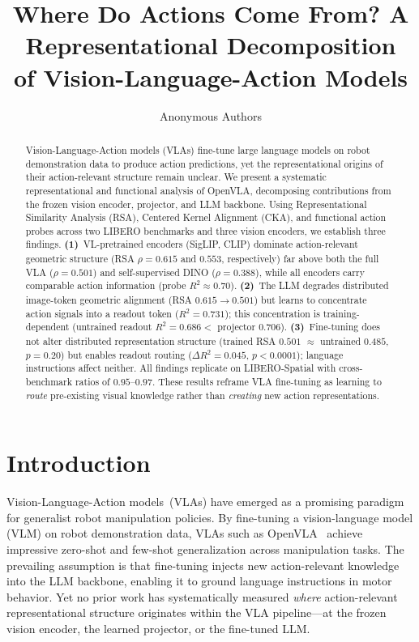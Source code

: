 \documentclass[letterpaper]{article}
\title{Where Do Actions Come From? A Representational Decomposition\\of Vision-Language-Action Models}
\author{
Anonymous Authors
}
\date{}
\begin{document}
\maketitle

\begin{abstract}
Vision-Language-Action models (VLAs) fine-tune large language models on robot demonstration data to produce action predictions, yet the representational origins of their action-relevant structure remain unclear.
We present a systematic representational and functional analysis of OpenVLA, decomposing contributions from the frozen vision encoder, projector, and LLM backbone.
Using Representational Similarity Analysis (RSA), Centered Kernel Alignment (CKA), and functional action probes across two LIBERO benchmarks and three vision encoders, we establish three findings.
\textbf{(1)}~VL-pretrained encoders (SigLIP, CLIP) dominate action-relevant geometric structure (RSA $\rho{=}0.615$ and $0.553$, respectively) far above both the full VLA ($\rho{=}0.501$) and self-supervised DINO ($\rho{=}0.388$), while all encoders carry comparable action information (probe $R^2{\approx}0.70$).
\textbf{(2)}~The LLM degrades distributed image-token geometric alignment (RSA $0.615{\to}0.501$) but learns to concentrate action signals into a readout token ($R^2{=}0.731$); this concentration is training-dependent (untrained readout $R^2{=}0.686 < $ projector $0.706$).
\textbf{(3)}~Fine-tuning does not alter distributed representation structure (trained RSA $0.501$ $\approx$ untrained $0.485$, $p{=}0.20$) but enables readout routing ($\Delta R^2{=}0.045$, $p{<}0.0001$); language instructions affect neither.
All findings replicate on LIBERO-Spatial with cross-benchmark ratios of $0.95$--$0.97$.
These results reframe VLA fine-tuning as learning to \emph{route} pre-existing visual knowledge rather than \emph{creating} new action representations.
\end{abstract}

\section{Introduction}
\label{sec:intro}

Vision-Language-Action models~(VLAs) have emerged as a promising paradigm for generalist robot manipulation policies.
By fine-tuning a vision-language model (VLM) on robot demonstration data, VLAs such as OpenVLA~\citep{kim2024openvla} achieve impressive zero-shot and few-shot generalization across manipulation tasks.
The prevailing assumption is that fine-tuning injects new action-relevant knowledge into the LLM backbone, enabling it to ground language instructions in motor behavior.
Yet no prior work has systematically measured \emph{where} action-relevant representational structure originates within the VLA pipeline---at the frozen vision encoder, the learned projector, or the fine-tuned LLM.
\end{document}
